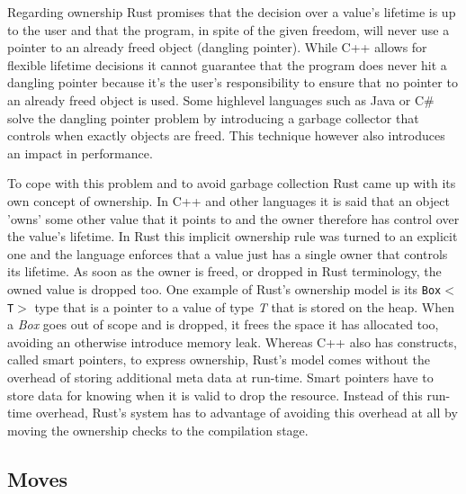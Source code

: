 Regarding ownership Rust promises that the decision over a value's lifetime is up to the user and that the program, in spite of the given freedom, will never use a pointer to an already freed object (dangling pointer). While C++ allows for flexible lifetime decisions it cannot guarantee that the program does never hit a dangling pointer because it's the user's responsibility to ensure that no pointer to an already freed object is used.
Some highlevel languages such as Java or C\# solve the dangling pointer problem by introducing a garbage collector that controls when exactly objects are freed. This technique however also introduces an impact in performance.

To cope with this problem and to avoid garbage collection Rust came up with its own concept of ownership. In C++ and other languages it is said that an object 'owns' some other value that it points to and the owner therefore has control over the value's lifetime. In Rust this implicit ownership rule was turned to an explicit one and the language enforces that a value just has a single owner that controls its lifetime. As soon as the owner is freed, or dropped in Rust terminology, the owned value is dropped too. One example of Rust's ownership model is its \texttt{Box$<$T$>$} type that is a pointer to a value of type \textit{T} that is stored on the heap. When a \textit{Box} goes out of scope and is dropped, it frees the space it has allocated too, avoiding an otherwise introduce memory leak. \cite[Chapter 4. Ownership]{ProRus}
Whereas C++ also has constructs, called smart pointers, to express ownership, Rust's model comes without the overhead of storing additional meta data at run-time. Smart pointers have to store data for knowing when it is valid to drop the resource. Instead of this run-time overhead, Rust's system has to advantage of avoiding this overhead at all by moving the ownership checks to the compilation stage.

\subsection{Moves}

